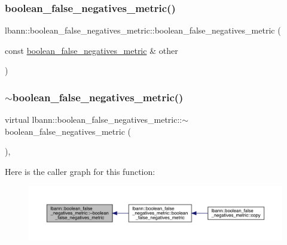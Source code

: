 \subsubsection{\texorpdfstring{boolean\+\_\+false\+\_\+negatives\+\_\+metric()}{boolean\_false\_negatives\_metric()}\hspace{0.1cm}{\footnotesize\ttfamily [2/2]}}
{\footnotesize\ttfamily lbann\+::boolean\+\_\+false\+\_\+negatives\+\_\+metric\+::boolean\+\_\+false\+\_\+negatives\+\_\+metric (\begin{DoxyParamCaption}\item[{const \hyperlink{classlbann_1_1boolean__false__negatives__metric}{boolean\+\_\+false\+\_\+negatives\+\_\+metric} \&}]{other }\end{DoxyParamCaption})\hspace{0.3cm}{\ttfamily [default]}}

\mbox{\label{classlbann_1_1boolean__false__negatives__metric_a85ce390a99cba31c006e148de4a9354c}} 
\subsubsection{\texorpdfstring{$\sim$boolean\+\_\+false\+\_\+negatives\+\_\+metric()}{~boolean\_false\_negatives\_metric()}}
{\footnotesize\ttfamily virtual lbann\+::boolean\+\_\+false\+\_\+negatives\+\_\+metric\+::$\sim$boolean\+\_\+false\+\_\+negatives\+\_\+metric (\begin{DoxyParamCaption}{ }\end{DoxyParamCaption})\hspace{0.3cm}{\ttfamily [virtual]}, {\ttfamily [default]}}

Here is the caller graph for this function\+:\nopagebreak
\begin{figure}[H]
\begin{center}
\leavevmode
\includegraphics[width=350pt]{classlbann_1_1boolean__false__negatives__metric_a85ce390a99cba31c006e148de4a9354c_icgraph}
\end{center}
\end{figure}


